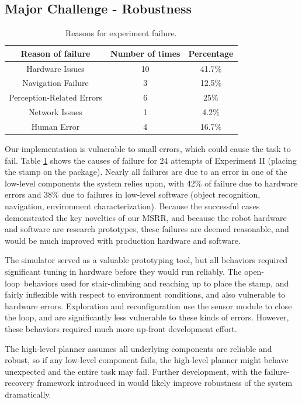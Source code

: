 \documentclass[journal]{IEEEtran}
\begin{document}
\subsection{Major Challenge - Robustness}
%
\begin{table}
\centering
\begin{tabular}{|c|c|c|}
\hline
\textbf{Reason of failure} & \textbf{Number of times} & \textbf{Percentage}\\ 
\hline
Hardware Issues & 10 & 41.7\% \\ 
\hline
Navigation Failure & 3 & 12.5\% \\ 
\hline
Perception-Related Errors & 6 & 25\% \\ 
\hline
Network Issues & 1 & 4.2\% \\ 
\hline
Human Error & 4 & 16.7\% \\ 
\hline
\end{tabular}
\caption{Reasons for experiment failure.}
\label{table:errors}
\vspace{-0.7cm}
\end{table}
%
Our implementation is vulnerable to small errors, which could cause the task to fail. 
Table \ref{table:errors} shows the causes of failure for 24 attempts of Experiment II (placing the stamp on the package).  
Nearly all failures are due to an error in one of the low-level components the system relies upon, with
42\% of failure due to hardware errors and 38\% due to failures in low-level software (object recognition, navigation, environment characterization). Because the successful cases demonstrated the key novelties of our MSRR, and because the robot hardware and software are research prototypes, these failures are deemed reasonable, and would be much improved with production hardware and software. 

The simulator served as a valuable prototyping tool, but all behaviors required significant
tuning in hardware before they would run reliably.  
The open-loop\ behaviors used for stair-climbing and reaching up to place the stamp, and fairly
inflexible with respect to environment conditions, and also vulnerable to hardware
errors. %
Exploration and reconfiguration use the sensor module to close the
loop, and are significantly less vulnerable to these kinds of errors.  
However, these behaviors required much more up-front development effort.

The high-level planner assumes all underlying components are reliable and robust, so if any low-level component fails, the high-level planner might behave unexpected and the entire task may fail. Further development, with the failure-recovery framework introduced in \cite{Maniatopoulos16icra} would likely improve robustness of the system dramatically.
\end{document}
